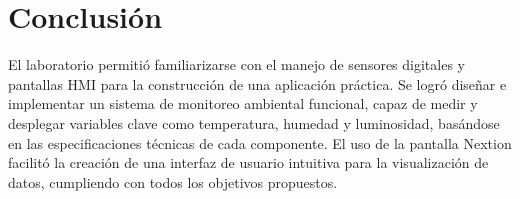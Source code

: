 \section{Conclusión}
El laboratorio permitió familiarizarse con el manejo de sensores digitales y pantallas HMI para la construcción de una aplicación práctica. Se logró diseñar e implementar un sistema de monitoreo ambiental funcional, capaz de medir y desplegar variables clave como temperatura, humedad y luminosidad, basándose en las especificaciones técnicas de cada componente. El uso de la pantalla Nextion facilitó la creación de una interfaz de usuario intuitiva para la visualización de datos, cumpliendo con todos los objetivos propuestos.


